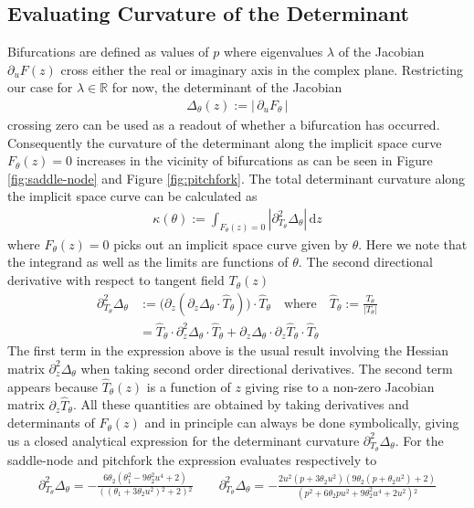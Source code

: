\documentclass{article}[12pt]
\numberwithin{equation}{section}
\begin{document}
\subsection{Evaluating Curvature of the Determinant}
Bifurcations are defined as values of $p$ where eigenvalues $\lambda$ of the Jacobian $\partial_u F(z)$ cross either the real or imaginary axis in the complex plane. Restricting our case for $\lambda\in\mathbb{R}$ for now, the determinant of the Jacobian
\begin{align}
    \Delta_\theta(z) := \big|\,\partial_u F_\theta\,\big|
\end{align}
crossing zero can be used as a readout of whether a bifurcation has occurred. Consequently the curvature of the determinant along the implicit space curve $F_{\theta}(z)=0$ increases in the vicinity of bifurcations as can be seen in Figure \ref{fig:saddle-node} and Figure \ref{fig:pitchfork}. The total determinant curvature along the implicit space curve can be calculated as
\begin{align}
    \kappa(\theta) := \int_{F_\theta(z)=0}\!|\partial_{T_\theta}^2\Delta_\theta|\,\mathrm{d}z
\end{align}
where $F_{\theta}(z)=0$ picks out an implicit space curve given by $\theta$. Here we note that the integrand as well as the limits are functions of $\theta$. The second directional derivative with respect to tangent field $T_\theta(z)$
\begin{align}
    \partial_{T_\theta}^2\Delta_\theta
    &:=
    \bigg(
        \partial_z\left(\partial_z\Delta_\theta\cdot \hat{T}_\theta\right)
    \bigg)\cdot \hat{T}_\theta\quad
    \mathrm{where}\quad\hat{T}_\theta:=\frac{T_\theta}{|T_\theta|}\\
    &=
        \hat{T}_\theta \cdot \partial_z^2\Delta_\theta \cdot \hat{T}_\theta+
        \partial_z\Delta_\theta\cdot \partial_z \hat{T}_\theta \cdot \hat{T}_\theta
\end{align}
The first term in the expression above is the usual result involving the Hessian matrix $\partial_z^2\Delta_\theta$ when taking second order directional derivatives. The second term appears because $\hat{T}_\theta(z)$ is a function of $z$ giving rise to a non-zero Jacobian matrix $\partial_z \hat{T}_\theta$. All these quantities are obtained by taking derivatives and determinants of $F_{\theta}(z)$ and in principle can always be done symbolically, giving us a closed analytical expression for the determinant curvature $\partial_{T_\theta}^2\Delta_\theta$. For the saddle-node and pitchfork the expression evaluates respectively to
\begin{align}
    \partial_{T_\theta}^2\Delta_\theta = 
    -\frac{6 \theta_2 \left(\theta _1^2-9 \theta _2^2 u^4+2\right)}
    {\left(\left(\theta _1+3 \theta _2 u^2\right){}^2+2\right){}^2}
    \qquad
    \partial_{T_\theta}^2\Delta_\theta =
    -\frac{2 u^2 \left(p+3 \theta _2 u^2\right) \left(9 \theta _2 \left(p+\theta _2 u^2\right)+2\right)}{\left(p^2+6 \theta _2 p u^2+9 \theta _2^2 u^4+2 u^2\right){}^2}
\end{align}
\end{document}
